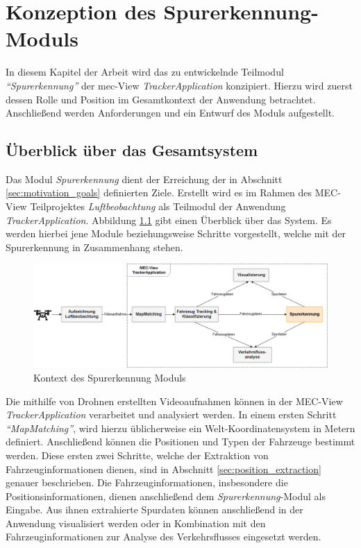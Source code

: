 
\chapter{Konzeption des Spurerkennung-Moduls}
\label{cha:konzeption}

In diesem Kapitel der Arbeit wird das zu entwickelnde Teilmodul \textit{``Spurerkennung''}
der \acrshort*{mec}-View \textit{TrackerApplication} konzipiert. Hierzu wird zuerst dessen Rolle und Position im Gesamtkontext
der Anwendung betrachtet. Anschließend werden Anforderungen und ein Entwurf des Moduls aufgestellt.

\section{Überblick über das Gesamtsystem}

Das Modul \textit{Spurerkennung} dient der Erreichung der in Abschnitt
\ref{sec:motivation_goals} definierten Ziele. Erstellt wird es im Rahmen des MEC-View Teilprojektes
\textit{Luftbeobachtung} als Teilmodul der Anwendung \textit{TrackerApplication}.
Abbildung \ref{fig:concept_laneDetection_context} gibt einen Überblick über das System.
Es werden hierbei jene Module beziehungsweise Schritte vorgestellt, welche mit der Spurerkennung in
Zusammenhang stehen.

\begin{figure}[H]
    \centering
    \includegraphics[width=\linewidth]{../resources/img/konzeption/Context_LaneDetection}
    \caption{Kontext des Spurerkennung Moduls}
    \label{fig:concept_laneDetection_context}
\end{figure}

Die mithilfe von Drohnen erstellten Videoaufnahmen können in der MEC-View \textit{TrackerApplication}
verarbeitet und analysiert werden. In einem ersten Schritt \textit{``MapMatching''}, wird hierzu üblicherweise
ein Welt-Koordinatensystem in Metern definiert. Anschließend können die Positionen und Typen
der Fahrzeuge bestimmt werden. Diese ersten zwei Schritte, welche der Extraktion von Fahrzeuginformationen
dienen, sind in Abschnitt \ref{sec:position_extraction} genauer beschrieben.
Die Fahrzeuginformationen, insbesondere die Positionsinformationen, dienen anschließend dem \textit{Spurerkennung}-Modul
als Eingabe. Aus ihnen extrahierte Spurdaten können anschließend in der Anwendung visualisiert werden oder in Kombination
mit den Fahrzeuginformationen zur Analyse des Verkehrsflusses eingesetzt werden.



